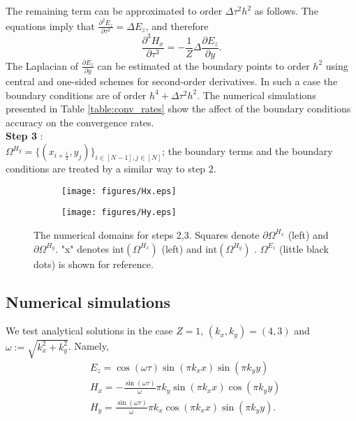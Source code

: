 \documentclass[12pt,reqno]{amsart}
\theoremstyle{definition}
\numberwithin{equation}{section}
\newcommand{\intr}[1]{\mathrm{int}(#1)}
\def\Gw{\Omega}     \def\Gx{\Xi}         \def\Gy{\Psi}
\begin{document}
	The remaining term 
	can be  approximated to order $\Delta \tau^2 h^2$ as follows.
	The equations imply that   $\frac{\partial^2E_z}{\partial \tau^2}=\Delta E_z$, and therefore
	$$
	\frac{\partial^3 H_x}{\partial \tau^3}=
	-\frac{1}{Z}\Delta \frac{\partial E_z }{\partial y}.
	$$
	The Laplacian of $\frac{\partial E_z }{\partial y}$ can be estimated at the boundary points  to order $h^2$ using central and one-sided schemes for second-order derivatives.
	In such a case the boundary conditions are of order $h^4+\Delta \tau^2h^2.$
	The numerical simulations   presented in  Table \ref{table:conv_rates} show the affect of the boundary conditions accuracy on the convergence rates.\\[1mm]
	{\bf Step 3} : \\ $\Gw^{H_y}=\{(x_{i+\frac{1}{2}},y_{j})\}_{i\in [N-1],j\in [N]}$; the boundary terms and the boundary conditions are treated by a similar way to step 2.
	
	\begin{figure}[!t]
		\centering
		\begin{subfigure}[h]{0.4\textwidth}
			\texttt{[image: figures/Hx.eps]}
		\end{subfigure}
		\begin{subfigure}[h]{0.4\textwidth}
			\texttt{[image: figures/Hy.eps]}
		\end{subfigure}
		\caption{The numerical domains for steps 2,3.
			Squares denote $\partial \Gw^{H_x}$ (left)  and $\partial \Gw^{H_y}$. "x" denotes $\intr{\Gw^{H_x}}$ (left) and $\intr{\Gw^{H_y}}$ . $\Gw^{E_z}$ (little black dots) is shown for reference.}
		\label{fig:Hx}			\end{figure}
	\subsection{Numerical simulations}
	We test analytical solutions in the case $Z=1$,  
	$(k_x,k_y)=(4,3)$ and $\omega:=\sqrt{k_x^2+k_y^2}$.
	Namely, 
	\begin{align*}
		&
		E_z=\cos(\omega \tau)
		\sin{\left( \pi  k_x x\right) } \sin{\left( \pi  k_y y\right) }
		\\ &
		H_x=-\frac{\sin( \omega \tau)}{\omega}
		\pi k_y \sin( \pi  k_x x)
		\cos{\left( \pi  k_y y\right) } \\&
		H_y=\frac{\sin\left( \omega \tau\right) }{\omega} \pi  k_x \cos{\left( \pi  k_x x\right) } \sin{\left( \pi  k_y y\right) }. \\&
	\end{align*}
	
\end{document}
